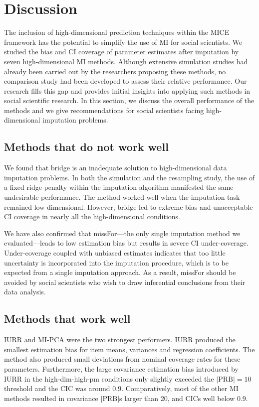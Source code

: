 \section{Discussion}

	The inclusion of high-dimensional prediction techniques within the MICE framework has the potential
	to simplify the use of MI for social scientists.
	We studied the bias and CI coverage of parameter estimates after imputation by seven high-dimensional MI methods.
	Although extensive simulation studies had already been carried out by the researchers proposing these methods, no comparison study had been developed to assess their relative performance.
	Our research fills this gap and provides initial insights into applying such methods in social scientific research.
	In this section, we discuss the overall performance of the methods and we give recommendations for social scientists 
	facing high-dimensional imputation problems.

\subsection{Methods that do not work well}

	We found that bridge is an inadequate solution to high-dimensional data imputation problems.
	In both the simulation and the resampling study, the use of a fixed ridge penalty within the imputation
	algorithm manifested the same undesirable performance.
	The method worked well when the imputation
	task remained low-dimensional.
	However, bridge led to extreme bias and unacceptable CI coverage in nearly all the high-dimensional conditions.

	We have also confirmed that missFor---the only single imputation method we evaluated---leads to low estimation 
	bias but results in severe CI under-coverage.
	Under-coverage coupled with unbiased estimates indicates that too little uncertainty is incorporated into 
	the imputation procedure, which is to be expected from a single imputation approach.
	As a result, missFor should be avoided by social scientists who wish to draw inferential 
	conclusions from their data analysis.

\subsection{Methods that work well}

	IURR and MI-PCA were the two strongest performers.
	IURR produced the smallest estimation bias for item means, variances and regression coefficients.
	The method also produced small deviations from nominal coverage rates for these parameters.
	Furthermore, the large covariance estimation bias introduced by IURR in the high-dim-high-pm conditions
	only slightly exceeded the $|\text{PRB}| = 10$ threshold and the CIC was around 0.9.
	Comparatively, most of the other MI methods resulted in covariance $|\text{PRB}|$s larger than 20, and CICs 
	well below 0.9.

